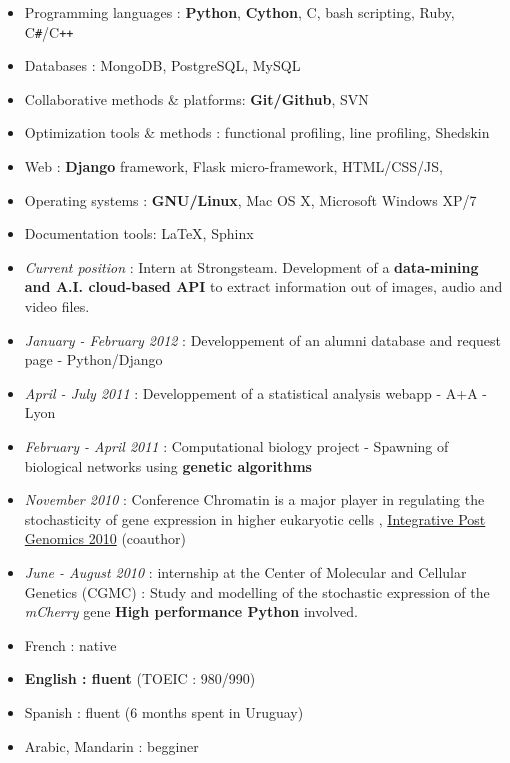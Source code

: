 
\begin{itemize}
\renewcommand{\labelitemi}{$\circ$}
    \item Programming languages : \textbf{Python}, \textbf{Cython}, C, bash scripting, Ruby, C\texttt{\#}/C\texttt{++}
    \item Databases : MongoDB, PostgreSQL, MySQL
    \item Collaborative methods \& platforms: \textbf{Git/Github}, SVN
    \item Optimization tools \& methods : functional profiling, line profiling, Shedskin 
    \item Web : \textbf{Django} framework, Flask micro-framework, HTML/CSS/JS, 
    \item Operating systems : \textbf{GNU/Linux}, Mac OS X, Microsoft Windows XP/7
    \item Documentation tools: LaTeX, Sphinx
\end{itemize}

\begin{itemize}
\renewcommand{\labelitemi}{$\circ$}
	\item \emph{Current position} : Intern at Strongsteam. Development of a \textbf{data-mining and A.I. cloud-based API} to extract information out of images, audio and video files.
	\item \emph{January - February 2012} : Developpement of an alumni database and request page - Python/Django
	\item \emph{April - July 2011} : Developpement of a statistical analysis webapp - A+A - Lyon
	\item \textit{February - April 2011} : Computational biology project - Spawning of biological networks using \textbf{genetic algorithms}
    \item \textit{November 2010} : Conference \og Chromatin is a major player in regulating the stochasticity of gene expression in higher eukaryotic cells \fg{}, \href{http://ipg.insa-lyon.fr/}{Integrative Post Genomics 2010} (coauthor)
    \item \textit{June - August 2010} : internship at the Center of Molecular and Cellular Genetics (CGMC) : \og Study and modelling of the stochastic expression of the \textit{mCherry} gene\fg{} \textbf{High performance Python }involved.
\end{itemize}

    \begin{itemize}
    \renewcommand{\labelitemi}{$\circ$}
    \item French : native
    \item \textbf{English : fluent} (TOEIC : 980/990)
    \item Spanish : fluent (6 months spent in Uruguay) 
    \item Arabic, Mandarin : begginer
\end{itemize}
    
